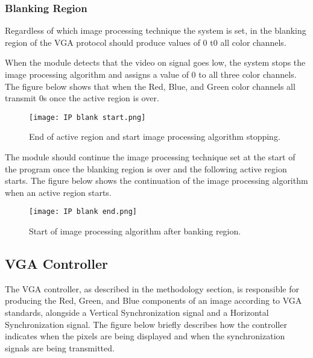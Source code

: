 \subsubsection{Blanking Region}
\par Regardless of which image processing technique the system is set, in the blanking region of the VGA protocol should produce values of 0 t0 all color channels. \newline
\par  When the module detects that the video on signal goes low, the system stops the image processing algorithm and assigns a value of 0 to all three color channels. The figure below shows that when the Red, Blue, and Green color channels all transmit 0s once the active region is over. \newline

\begin{figure}[H]
	\centering
	\texttt{[image: IP blank start.png]}
	\caption{End of active region and start image processing algorithm stopping.}
	\label{fig:ipstartblank}  
\end{figure}

\par The module should continue the image processing technique set at the start of the program once the blanking region is over and the following active region starts. The figure below shows the continuation of the image processing algorithm when an active region starts. \newline 

\begin{figure}[H]
	\centering
	\texttt{[image: IP blank end.png]}
	\caption{Start of image processing algorithm after banking region.}
	\label{fig:ipendblank}  
\end{figure}

\subsection{VGA Controller}
\par The VGA controller, as described in the methodology section, is responsible for producing the Red, Green, and Blue components of an image according to VGA standards, alongside a Vertical Synchronization signal and a Horizontal Synchronization signal. The figure below briefly describes how the controller indicates when the pixels are being displayed and when the synchronization signals are being transmitted. \newline

